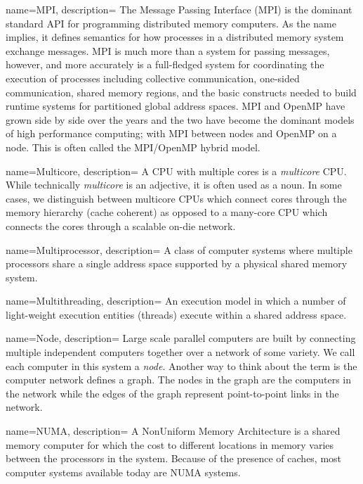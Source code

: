 {
   name={MPI},
   description={
  The Message Passing Interface (MPI) is the dominant standard
   API for programming distributed memory computers.  As the name implies,
   it defines semantics for how processes in a distributed memory system exchange messages.
   MPI is much more than a system for passing messages, however, and more accurately is a full-fledged
   system for coordinating the execution of processes including collective communication, 
   one-sided communication, shared memory regions, and the basic constructs needed to 
   build runtime systems for partitioned global address spaces.  MPI and OpenMP have 
   grown side by side over the years and the two have become the dominant models of
   high performance computing; with MPI between nodes and OpenMP on a node.  This is 
   often called the MPI/OpenMP hybrid model.
   }
}   


{
   name={Multicore},
   description={
   A CPU with multiple cores is a \emph{multicore} CPU. While technically \emph{multicore} is
   an adjective, it is often used as a noun.   In some cases, we distinguish between multicore 
   CPUs which connect cores through the memory hierarchy (cache coherent) as opposed to 
   a many-core CPU which connects the cores through a scalable on-die network.
   }
}   


{
   name={Multiprocessor},
   description={
   A class of computer systems where multiple processors share a single address space
   supported by a physical shared memory system.  
   }
}   


{
   name={Multithreading},
   description={
   An execution model in which a number of light-weight execution entities (threads) execute 
   within a shared address space.  
   }
}   


{
   name={Node},
   description={
   Large scale parallel computers are built by connecting multiple independent computers together
   over a network of some variety.   We call each computer in this system a \emph{node}.  Another way
   to think about the term is the computer network defines a graph.  The nodes in the graph are
   the computers in the network while the edges of the graph represent point-to-point links in the network.
   }
}   

{
   name={NUMA},
   description={
   A NonUniform Memory Architecture is a shared memory computer for which
   the cost to different locations in memory varies between the processors in the system.  Because of the presence of
   caches, most computer systems available today are NUMA systems.
   }
}   


